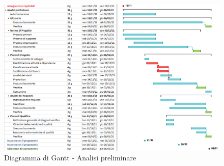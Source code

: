 
\begin{figure}[H]
  \centering
  \includegraphics[scale=0.58]{immagini/analisi_preliminare.png}
  \caption{Diagramma di Gantt - Analisi preliminare}
\end{figure}
\pagebreak

